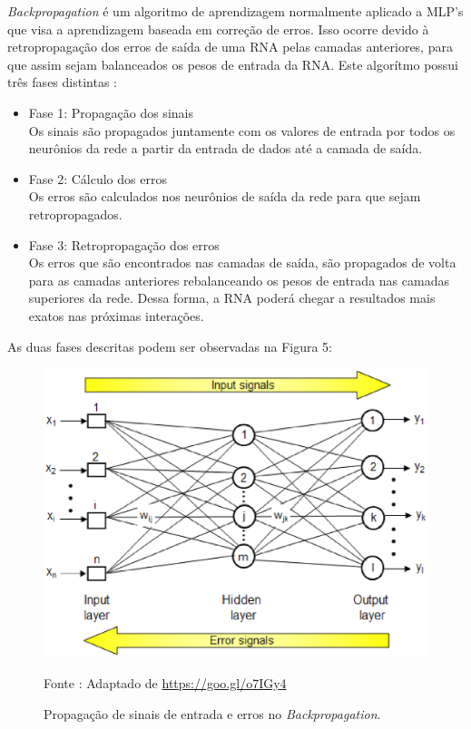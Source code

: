 \textit{Backpropagation} é um algoritmo de aprendizagem normalmente aplicado a MLP's que visa a aprendizagem baseada em correção de erros. Isso ocorre devido à retropropagação dos erros de saída de uma RNA pelas camadas anteriores, para que assim sejam balanceados os pesos de entrada da RNA.
Este algorítmo possui três fases distintas \cite{netto2006} :

\begin{itemize}
    \item Fase 1: Propagação dos sinais \\ Os sinais são propagados juntamente com os valores de entrada por todos os neurônios da rede a partir da entrada de dados até a camada de saída.
    \item Fase 2: Cálculo dos erros \\ Os erros são calculados nos neurônios de saída da rede para que sejam retropropagados.
    \item Fase 3: Retropropagação dos erros \\ Os erros que são encontrados nas camadas de saída, são propagados de volta para as camadas anteriores rebalanceando os pesos de entrada nas camadas superiores da rede. Dessa forma, a RNA poderá chegar a resultados mais exatos nas próximas interações.
\end{itemize}

As duas fases descritas podem ser observadas na Figura 5:

\begin{figure}[ht]
        \centering
        \label{fig05}
            \includegraphics[keepaspectratio=true, scale=0.4]{editaveis/images/backprop.eps}
        \caption{Propagação de sinais de entrada e erros no \textit{Backpropagation}.}
        Fonte : Adaptado de \url{https://goo.gl/o7IGy4}
\end{figure}

